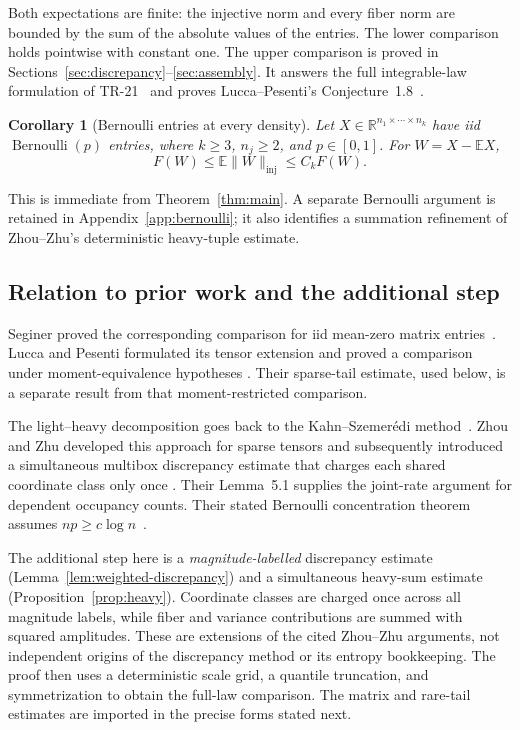 \documentclass[11pt]{article}
\theoremstyle{spaced}
\newtheorem{corollary}[theorem]{Corollary}
\theoremstyle{remark}
\numberwithin{equation}{section}
\newcommand{\E}{\mathbb E}
\newcommand{\inj}{\mathrm{inj}}
\begin{document}
Both expectations are finite: the injective norm and every fiber norm
are bounded by the sum of the absolute values of the entries.
The lower comparison holds pointwise with constant one. The upper
comparison is proved in Sections~\ref{sec:discrepancy}--\ref{sec:assembly}.
It answers the full integrable-law formulation of TR-21~\cite{TR} and
proves Lucca--Pesenti's Conjecture~1.8~\cite{LP}.

\begin{corollary}[Bernoulli entries at every density]\label{cor:bernoulli}
Let $X\in\mathbb R^{n_1\times\cdots\times n_k}$ have iid
$\operatorname{Bernoulli}(p)$ entries, where $k\ge3$, $n_j\ge2$, and
$p\in[0,1]$. For $W=X-\E X$,
\[
 F(W)\le\E\|W\|_{\inj}\le C_kF(W).
\]
\end{corollary}

This is immediate from Theorem~\ref{thm:main}. A separate Bernoulli
argument is retained in Appendix~\ref{app:bernoulli}; it also identifies
a summation refinement of Zhou--Zhu's deterministic heavy-tuple estimate.

\subsection{Relation to prior work and the additional step}

Seginer proved the corresponding comparison for iid mean-zero matrix
entries~\cite[Corollary~2.2]{Seg}. Lucca and Pesenti formulated its tensor
extension and proved a comparison under moment-equivalence hypotheses
\cite[Assumption~1.6, Theorem~1.7, and Conjecture~1.8]{LP}.
Their sparse-tail estimate, used below, is a separate result from that
moment-restricted comparison.

The light--heavy decomposition goes back to the Kahn--Szemer\'edi
method~\cite{FKS}. Zhou and Zhu developed this approach for sparse tensors
\cite{ZZ21} and subsequently introduced a simultaneous multibox
discrepancy estimate that charges each shared coordinate class only once
\cite[Lemmas~4.4--4.5, Proposition~4.6, and Appendix~A]{ZZ}.
Their Lemma~5.1 supplies the joint-rate argument for dependent occupancy
counts. Their stated Bernoulli concentration theorem assumes
$np\ge c\log n$~\cite[Theorem~2.1]{ZZ}.

The additional step here is a \emph{magnitude-labelled} discrepancy
estimate (Lemma~\ref{lem:weighted-discrepancy}) and a simultaneous
heavy-sum estimate (Proposition~\ref{prop:heavy}). Coordinate classes are
charged once across all magnitude labels, while fiber and variance
contributions are summed with squared amplitudes. These are extensions
of the cited Zhou--Zhu arguments, not independent origins of the
discrepancy method or its entropy bookkeeping. The proof then uses a
deterministic scale grid, a quantile truncation, and symmetrization to
obtain the full-law comparison. The matrix and rare-tail estimates are
imported in the precise forms stated next.
\end{document}
